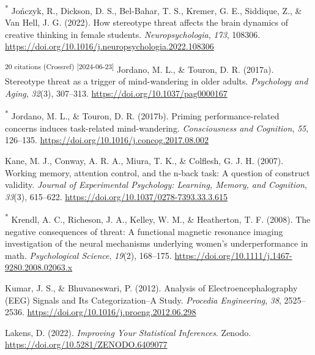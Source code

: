 \documentclass[
  stu, a4paper,floatsintext]{apa7}
\newlength{\cslhangindent}
\newenvironment{CSLReferences}[2] %
 {\begin{list}{}{%
  \setlength{\itemindent}{0pt}
  \setlength{\leftmargin}{0pt}
  \setlength{\parsep}{0pt}
  \ifodd #1
   \setlength{\leftmargin}{\cslhangindent}
   \setlength{\itemindent}{-1\cslhangindent}
  \fi
  \setlength{\itemsep}{#2\baselineskip}}}
 {\end{list}}
\begin{document}
\begin{CSLReferences}{1}{0}
\textsuperscript{*} Jończyk, R., Dickson, D. S., Bel-Bahar, T. S., Kremer, G. E., Siddique, Z., \& Van Hell, J. G. (2022). How stereotype threat affects the brain dynamics of creative thinking in female students. \emph{Neuropsychologia}, \emph{173}, 108306. \url{https://doi.org/10.1016/j.neuropsychologia.2022.108306}

\textsuperscript{20 citations (Crossref) {[}2024-06-23{]}} Jordano, M. L., \& Touron, D. R. (2017a). Stereotype threat as a trigger of mind-wandering in older adults. \emph{Psychology and Aging}, \emph{32}(3), 307--313. \url{https://doi.org/10.1037/pag0000167}

\textsuperscript{*} Jordano, M. L., \& Touron, D. R. (2017b). Priming performance-related concerns induces task-related mind-wandering. \emph{Consciousness and Cognition}, \emph{55}, 126--135. \url{https://doi.org/10.1016/j.concog.2017.08.002}

Kane, M. J., Conway, A. R. A., Miura, T. K., \& Colflesh, G. J. H. (2007). Working memory, attention control, and the n-back task: {A} question of construct validity. \emph{Journal of Experimental Psychology: Learning, Memory, and Cognition}, \emph{33}(3), 615--622. \url{https://doi.org/10.1037/0278-7393.33.3.615}

\textsuperscript{*} Krendl, A. C., Richeson, J. A., Kelley, W. M., \& Heatherton, T. F. (2008). The negative consequences of threat: A functional magnetic resonance imaging investigation of the neural mechanisms underlying women's underperformance in math. \emph{Psychological Science}, \emph{19}(2), 168--175. \url{https://doi.org/10.1111/j.1467-9280.2008.02063.x}

Kumar, J. S., \& Bhuvaneswari, P. (2012). Analysis of {Electroencephalography} ({EEG}) {Signals} and {Its Categorization}--{A Study}. \emph{Procedia Engineering}, \emph{38}, 2525--2536. \url{https://doi.org/10.1016/j.proeng.2012.06.298}

Lakens, D. (2022). \emph{Improving {Your Statistical Inferences}}. Zenodo. \url{https://doi.org/10.5281/ZENODO.6409077}


\end{CSLReferences}
\end{document}
